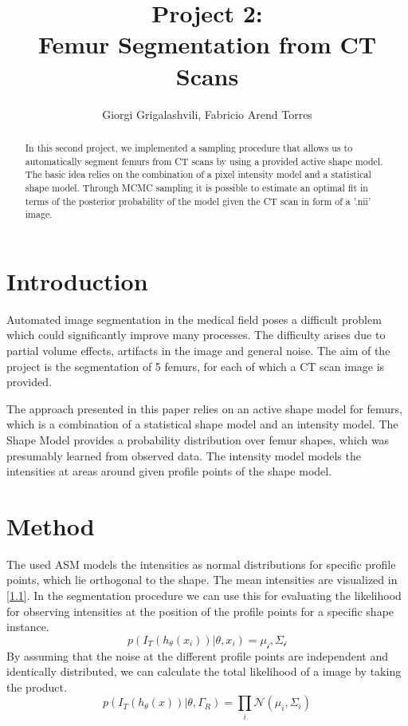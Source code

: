 \documentclass{article}
\begin{document}
	\author{Giorgi Grigalashvili, Fabricio Arend Torres}
		\title{Project 2:\\ Femur Segmentation from CT Scans}
	\maketitle
	\begin{abstract}
		In this second project, we implemented a sampling procedure that allows us to automatically segment femurs from CT scans by using a provided active shape model.
		The basic idea relies on the combination of a pixel intensity model and a statistical shape model.
		Through MCMC sampling it is possible to estimate an optimal fit in terms of the posterior probability of the model given the CT scan in form of a '.nii' image.
	\end{abstract}
	

	\section{Introduction}
	Automated image segmentation in the medical field poses a difficult problem which could significantly improve many processes.
	The difficulty arises due to partial volume effects, artifacts in the image and general noise.
	The aim of the project is the segmentation of 5 femurs, for each of which a CT scan image is provided. 
		
	The approach presented in this paper relies on an active shape model for femurs, which is a combination of a statistical shape model and an intensity model.
	The Shape Model provides a probability distribution over femur shapes, which was presumably learned from observed data.
	The intensity model models the intensities at areas around given profile points of the shape model.	


	\section{Method}
	The used ASM models the intensities as normal distributions for specific profile points, which lie orthogonal to the shape.
	The mean intensities are visualized in \autoref{1.1}.
	In the segmentation procedure we can use this for evaluating the likelihood for observing intensities at the position of the profile points for a specific shape instance.
	\begin{equation}
	p(I_T (h_\theta (x_i)) | \theta,x_i ) = \mathcal{\mu_i, \Sigma_i} 
	\end{equation}
	By assuming that the noise at the different profile points are independent and identically distributed, we can calculate the total likelihood of a image by taking the product.
	\begin{equation}
	p(I_T(h_\theta (x))|\theta, \Gamma_R) = \prod_{i} \mathcal{N}(\mu_i, \Sigma_i)
	\end{equation}
	
\end{document}
